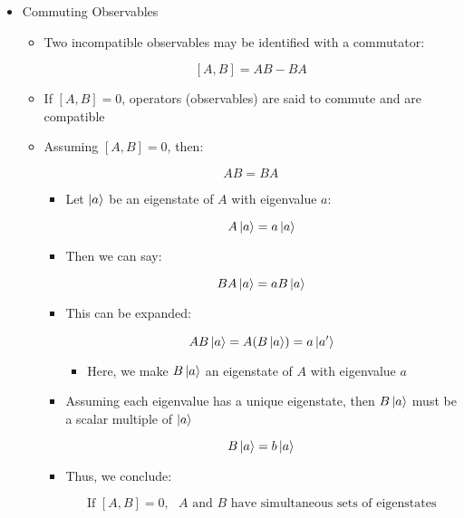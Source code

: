\begin{itemize}
\begin{itemize}
\begin{itemize}
        \end{itemize}

    \end{itemize}

  \item Commuting Observables

    \begin{itemize}

      \item Two incompatible observables may be identified with a commutator:

        $$[A,B]=AB-BA$$

      \item If $[A,B]=0$, operators (observables) are said to commute and are compatible

      \item Assuming $[A,B]=0$, then:

        $$AB=BA$$

        \begin{itemize}

          \item Let $\ket{a}$ be an eigenstate of $A$ with eigenvalue $a$:

            $$A\ket{a}=a\ket{a}$$

          \item Then we can say:

            $$BA\ket{a}=aB\ket{a}$$

          \item This can be expanded:

            $$AB\ket{a}=A(B\ket{a})=a\ket{a'}$$

            \begin{itemize}

              \item Here, we make $B\ket{a}$ an eigenstate of $A$ with eigenvalue $a$

            \end{itemize}

          \item Assuming each eigenvalue has a unique eigenstate, then $B\ket{a}$ must be a scalar multiple of $\ket{a}$

            $$B\ket{a}=b\ket{a}$$

          \item Thus, we conclude:

            $$\text{If }[A,B]=0,\text{ }A\text{ and }B\text{ have simultaneous sets of eigenstates}$$


\end{itemize}
\end{itemize}
\end{itemize}
